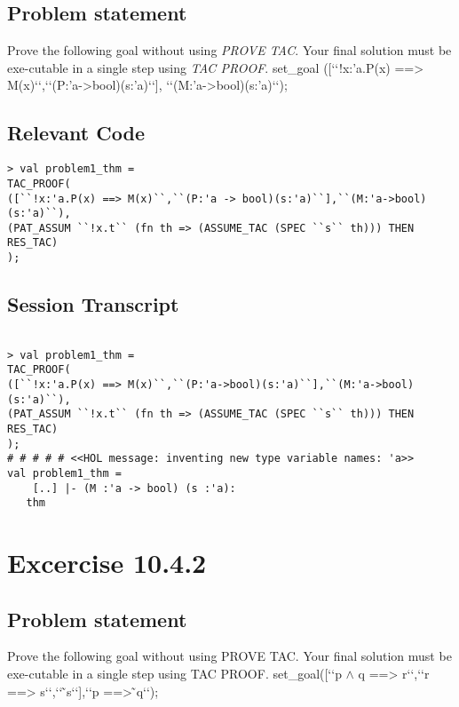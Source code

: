 \documentclass{report}
\begin{document}
\section{Problem statement}
\label{problem-statement-10-4-1}
Prove the following goal without using \emph{PROVE TAC}. Your final solution must be exe-cutable in a single step using \emph{TAC PROOF}.
set_goal
([‘‘!x:’a.P(x) ==> M(x)‘‘,‘‘(P:’a->bool)(s:’a)‘‘],
‘‘(M:’a->bool)(s:’a)‘‘);

\section{Relevant Code}
\label{rel-code-10-4-1}
\begin{lstlisting}[frame=TBlr]
> val problem1_thm =
TAC_PROOF(
([``!x:'a.P(x) ==> M(x)``,``(P:'a -> bool)(s:'a)``],``(M:'a->bool)(s:'a)``),
(PAT_ASSUM ``!x.t`` (fn th => (ASSUME_TAC (SPEC ``s`` th))) THEN
RES_TAC)
);
\end{lstlisting}

\section{Session Transcript}
\label{trans-10-4-1}

\begin{session}
  \begin{scriptsize}
\begin{verbatim}

> val problem1_thm =
TAC_PROOF(
([``!x:'a.P(x) ==> M(x)``,``(P:'a->bool)(s:'a)``],``(M:'a->bool)(s:'a)``),
(PAT_ASSUM ``!x.t`` (fn th => (ASSUME_TAC (SPEC ``s`` th))) THEN
RES_TAC)
);
# # # # # <<HOL message: inventing new type variable names: 'a>>
val problem1_thm =
    [..] |- (M :'a -> bool) (s :'a):
   thm
\end{verbatim}
  \end{scriptsize}
\end{session}


\chapter{Excercise 10.4.2}
\label{cha:10.4.2}

\section{Problem statement}
\label{problem-statement-10-4-2}
Prove the following goal without using PROVE TAC. Your final solution must be exe-cutable in a single step using TAC PROOF.
set_goal([‘‘p $\land$ q ==> r‘‘,‘‘r ==> s‘‘,‘‘ ̃s‘‘],‘‘p ==>  ̃q‘‘); 
\end{document}
